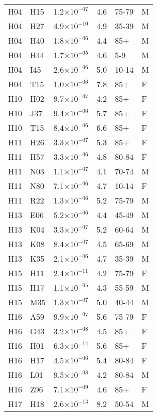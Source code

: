 \begin{longtable}{lllrll}
   H04 & H15 & 1.2$\times10^{-07}$ & 4.6 & 75-79 & M \\ 
   H04 & H27 & 4.9$\times10^{-10}$ & 4.9 & 35-39 & M \\ 
   H04 & H40 & 1.8$\times10^{-06}$ & 4.4 & 85+ & M \\ 
   H04 & H44 & 1.7$\times10^{-05}$ & 4.6 & 5-9 & M \\ 
   H04 & I45 & 2.6$\times10^{-06}$ & 5.0 & 10-14 & M \\ 
   H04 & T15 & 1.0$\times10^{-06}$ & 7.8 & 85+ & F \\ 
   H10 & H02 & 9.7$\times10^{-07}$ & 4.2 & 85+ & F \\ 
   H10 & J37 & 9.4$\times10^{-06}$ & 5.7 & 85+ & F \\ 
   H10 & T15 & 8.4$\times10^{-06}$ & 6.6 & 85+ & F \\ 
   H11 & H26 & 3.3$\times10^{-07}$ & 5.3 & 85+ & F \\ 
   H11 & H57 & 3.3$\times10^{-06}$ & 4.8 & 80-84 & F \\ 
   H11 & N03 & 1.1$\times10^{-07}$ & 4.1 & 70-74 & M \\ 
   H11 & N80 & 7.1$\times10^{-06}$ & 4.7 & 10-14 & F \\ 
   H11 & R22 & 1.3$\times10^{-06}$ & 5.2 & 75-79 & M \\ 
   H13 & E06 & 5.2$\times10^{-06}$ & 4.4 & 45-49 & M \\ 
   H13 & K04 & 3.3$\times10^{-07}$ & 5.2 & 60-64 & M \\ 
   H13 & K08 & 8.4$\times10^{-07}$ & 4.5 & 65-69 & M \\ 
   H13 & K35 & 2.1$\times10^{-06}$ & 4.7 & 35-39 & M \\ 
   H15 & H11 & 2.4$\times10^{-11}$ & 4.2 & 75-79 & F \\ 
   H15 & H17 & 1.1$\times10^{-05}$ & 4.3 & 55-59 & M \\ 
   H15 & M35 & 1.3$\times10^{-07}$ & 5.0 & 40-44 & M \\ 
   H16 & A59 & 9.9$\times10^{-07}$ & 5.6 & 75-79 & F \\ 
   H16 & G43 & 3.2$\times10^{-08}$ & 4.5 & 85+ & F \\ 
   H16 & H01 & 6.3$\times10^{-14}$ & 5.6 & 85+ & F \\ 
   H16 & H17 & 4.5$\times10^{-06}$ & 5.4 & 80-84 & F \\ 
   H16 & L01 & 9.5$\times10^{-08}$ & 4.2 & 80-84 & M \\ 
   H16 & Z96 & 7.1$\times10^{-09}$ & 4.6 & 85+ & F \\ 
   H17 & H18 & 2.6$\times10^{-13}$ & 8.2 & 50-54 & M \\ 

\end{longtable}
